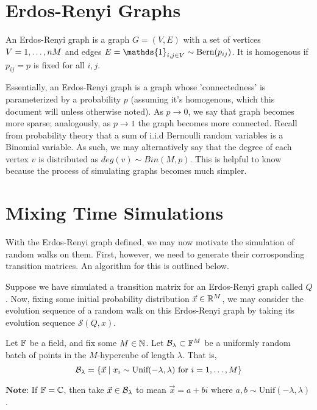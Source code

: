 \section{Erdos-Renyi Graphs}

\begin{definition}
An Erdos-Renyi graph is a graph $G = (V,E)$ with a set of vertices $V = \oneto{M}$ and edges $E = \mathds{1}_{i,j \in V} \sim \Bern(p_{ij})$. It is homogenous if $p_{ij} = p$ is fixed for all $i, j$.
\end{definition}

Essentially, an Erdos-Renyi graph is a graph whose 'connectedness' is parameterized by a probability $p$ (assuming it's homogenous, which this document will unless otherwise noted). As $p \to 0$, we say that graph becomes more sparse; analogously, as $p \to 1$ the graph becomes more connected.\newline
\indent Recall from probability theory that a sum of i.i.d Bernoulli random variables is a Binomial variable. As such, we may alternatively say that the degree of each vertex $v$ is distributed as $deg(v) \sim Bin(M,p)$. This is helpful to know because the process of simulating graphs becomes much simpler.

\section{Mixing Time Simulations}
With the Erdos-Renyi graph defined, we may now motivate the simulation of random walks on them. First, however, we need to generate their corrosponding transition matrices. An algorithm for this is outlined below.

Suppose we have simulated a transition matrix for an Erdos-Renyi graph called $Q$. Now, fixing some initial probability distribution $\vec{x} \in \R^M$, we may consider the evolution sequence of a random walk on this Erdos-Renyi graph by taking its evolution sequence $\mathcal{S}(Q, x)$.

\begin{definition}
Let $\F$ be a field, and fix some $M \in \N$. Let $\B_\lambda \subset \F^M$ be a uniformly random batch of points in the $M$-hypercube of length $\lambda$. That is, 
$$\B_\lambda = \{\vec{x} \mid x_i \sim \text{Unif}(-\lambda, \lambda) \text{ for } i = \oneto[M]\}$$

$\textbf{Note:}$ If $\F = \mathbb{C}$, then take $\vec{x} \in \B_\lambda$ to mean $\vec{x} = a + bi \text{ where } a,b \sim \text{Unif}(-\lambda,\lambda)$.
\end{definition}



